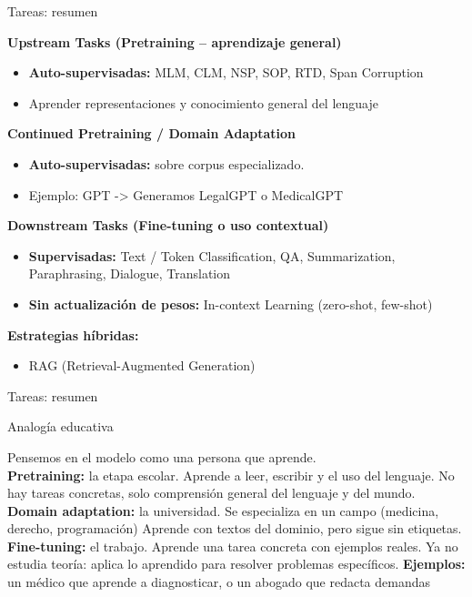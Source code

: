 \begin{frame}{Tareas: resumen}

\textbf{Upstream Tasks (Pretraining – aprendizaje general)}
\begin{itemize}
  \item \textbf{Auto-supervisadas:} MLM, CLM, NSP, SOP, RTD, Span Corruption
  \item Aprender representaciones y conocimiento general del lenguaje
\end{itemize}

\textbf{Continued Pretraining / Domain Adaptation}
\begin{itemize}
  \item \textbf{Auto-supervisadas:} sobre corpus especializado.
  \item Ejemplo: GPT -> Generamos LegalGPT o MedicalGPT
\end{itemize}

\textbf{Downstream Tasks (Fine-tuning o uso contextual)}
\begin{itemize}
  \item \textbf{Supervisadas:} Text / Token Classification, QA, Summarization, Paraphrasing, Dialogue, Translation
  \item \textbf{Sin actualización de pesos:} In-context Learning (zero-shot, few-shot)
\end{itemize}

\textbf{Estrategias híbridas:}
\begin{itemize}
    \item RAG (Retrieval-Augmented Generation)
\end{itemize}

\end{frame}


\begin{frame}{Tareas: resumen}


\begin{block}{Analogía educativa}

Pensemos en el modelo como una persona que aprende. \\[0.5em]

\textbf{Pretraining:} la etapa escolar. Aprende a leer, escribir y el uso del lenguaje.  
No hay tareas concretas, solo comprensión general del lenguaje y del mundo. \\[0.5em]

\textbf{Domain adaptation:} la universidad. Se especializa en un campo (medicina, derecho, programación)
Aprende con textos del dominio, pero sigue sin etiquetas. \\[0.5em]

\textbf{Fine-tuning:} el trabajo. Aprende una tarea concreta con ejemplos reales.  
Ya no estudia teoría: aplica lo aprendido para resolver problemas específicos. \textbf{Ejemplos:} un médico que aprende a diagnosticar, o un abogado que redacta demandas

\end{block}
\end{frame}


